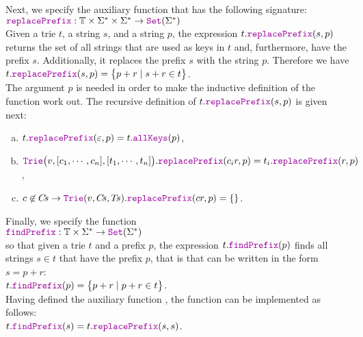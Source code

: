 Next, we specify the auxiliary function  that has the following signature:
\\[0.2cm]
\hspace*{1.3cm}
$\mytt{replacePrefix}: \mathbb{T} \times \Sigma^* \times \Sigma^* \rightarrow \mytt{Set}(\Sigma^*)$
\\[0.2cm]
Given a trie $t$, a string $s$, and a string $p$, the expression $t.\mytt{replacePrefix}(s, p)$ returns the
set of all strings that are used as keys in $t$ 
and, furthermore, have the prefix $s$.  Additionally, it replaces the prefix $s$ with the string $p$.  Therefore
we have
\\[0.2cm]
\hspace*{1.3cm}
$t.\mytt{replacePrefix}(s, p) = \bigl\{ p+r \mid s + r \in t \bigr\}$.
\\[0.2cm]
The argument $p$ is needed in order to make the inductive definition of the function
 work out.  The recursive definition of $t.\mytt{replacePrefix}(s, p)$ is given next:
\begin{enumerate}[(a)]
\item $t.\mytt{replacePrefix}(\varepsilon, p) = t.\mytt{allKeys}(p)$,
\item $\mytt{Trie}\bigl(v, [c_1, \cdots, c_n], [t_1,\cdots,t_n]\bigr).\mytt{replacePrefix}(c_ir, p) = 
       t_i.\mytt{replacePrefix}(r, p) 
      $,
\item $c \not\in C\!s \rightarrow \mytt{Trie}(v, C\!s, T\!s).\mytt{replacePrefix}(cr, p) = \{\}$.
\end{enumerate}
Finally, we specify the function 
\\[0.2cm]
\hspace*{1.3cm}
$\mytt{findPrefix}:\mathbb{T} \times \Sigma^* \rightarrow \mytt{Set}(\Sigma^*)$
\\[0.2cm]
so that given a trie $t$ and a prefix $p$, the expression $t.\mytt{findPrefix}(p)$ finds all
strings $s \in t$ that have the prefix $p$, that is that can be written in the form $s=p+r$:
\\[0.2cm]
\hspace*{1.3cm}
$t.\mytt{findPrefix}(p) = \bigl\{ p+r \mid p+r \in t \bigr\}$.
\\[0.2cm]
Having defined the auxiliary function , the function  can be
implemented as follows:
\\[0.2cm]
\hspace*{1.3cm}
$t.\mytt{findPrefix}(s) = t.\mytt{replacePrefix}(s, s)$.



